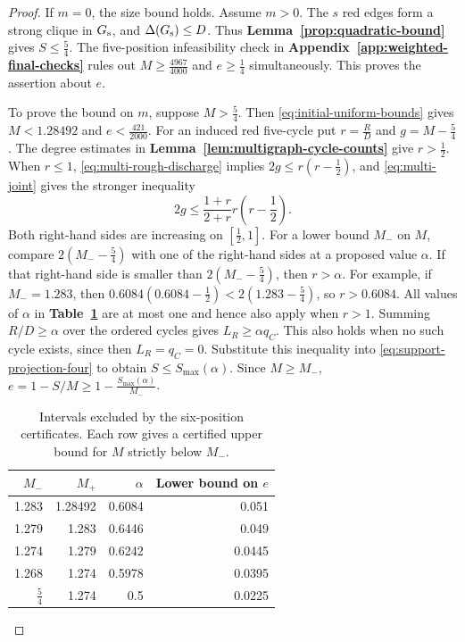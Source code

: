 \documentclass[preprint,11pt,numbers]{elsarticle-arxiv}
\numberwithin{equation}{section}
\theoremstyle{definition}
\begin{document}
\begin{proof}
If $m=0$, the size bound holds. Assume $m>0$. The $s$ red edges
form a strong clique in $G_{\rm s}$, and $\Delta(G_{\rm s})\leq D$.
Thus \textbf{Lemma~\ref{prop:quadratic-bound}} gives
$S\leq\frac54$. The five-position infeasibility check in
\textbf{Appendix~\ref{app:weighted-final-checks}} rules out
$M\geq\frac{4967}{4000}$ and $e\geq\frac14$ simultaneously.
This proves the assertion about $e$.

To prove the bound on $m$, suppose $M>\frac54$. Then
\eqref{eq:initial-uniform-bounds} gives $M<1.28492$ and
$e<\frac{421}{2000}$. For an induced red five-cycle put
$r=\frac RD$ and $g=M-\frac54$. The degree estimates in
\textbf{Lemma~\ref{lem:multigraph-cycle-counts}} give $r>\frac12$.
When $r\leq1$, \eqref{eq:multi-rough-discharge} implies
$2g\leq r(r-\frac12)$, and \eqref{eq:multi-joint} gives the
stronger inequality
\[
 2g\leq\frac{1+r}{2+r}r\left(r-\frac12\right).
\]
Both right-hand sides are increasing on $[\frac12,1]$.
For a lower bound $M_-$ on $M$, compare $2(M_--\frac54)$ with
one of the right-hand sides at a proposed value $\alpha$.
If that right-hand side is smaller than $2(M_--\frac54)$, then
$r>\alpha$.
For example, if $M_-=1.283$, then
$0.6084(0.6084-\frac12)<2(1.283-\frac54)$, so $r>0.6084$.
All values of $\alpha$ in \textbf{Table~\ref{tab:uniform-chain}}
are at most one and hence also apply when $r>1$.
Summing $R/D\geq\alpha$ over the ordered cycles gives
$L_R\geq\alpha q_C$. This also holds when no such cycle exists,
since then $L_R=q_C=0$. Substitute this inequality into
\eqref{eq:support-projection-four} to obtain
$S\leq S_{\max}(\alpha)$. Since $M\geq M_-$,
$e=1-S/M\geq1-\frac{S_{\max}(\alpha)}{M_-}$.

\begin{table}[htbp]
\centering
\caption{Intervals excluded by the six-position certificates. Each row
gives a certified upper bound for $M$ strictly below $M_-$.}
\label{tab:uniform-chain}
\begin{tabular}{@{}rrrr@{}}
\toprule
$M_-$ & $M_+$ & $\alpha$ & Lower bound on $e$\\
\midrule
1.283 & 1.28492 & 0.6084 & 0.051\\
1.279 & 1.283 & 0.6446 & 0.049\\
1.274 & 1.279 & 0.6242 & 0.0445\\
1.268 & 1.274 & 0.5978 & 0.0395\\
$\frac54$ & 1.274 & 0.5 & 0.0225\\
\bottomrule
\end{tabular}
\end{table}


\end{proof}
\end{document}
